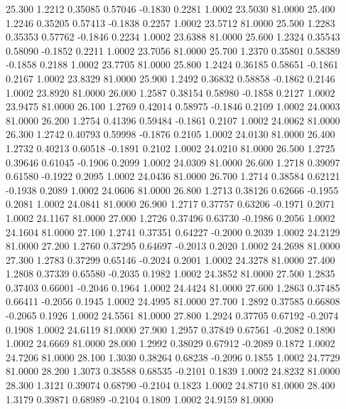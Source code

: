   25.300   1.2212   0.35085   0.57046  -0.1830   0.2281   1.0002  23.5030  81.0000
  25.400   1.2246   0.35205   0.57413  -0.1838   0.2257   1.0002  23.5712  81.0000
  25.500   1.2283   0.35353   0.57762  -0.1846   0.2234   1.0002  23.6388  81.0000
  25.600   1.2324   0.35543   0.58090  -0.1852   0.2211   1.0002  23.7056  81.0000
  25.700   1.2370   0.35801   0.58389  -0.1858   0.2188   1.0002  23.7705  81.0000
  25.800   1.2424   0.36185   0.58651  -0.1861   0.2167   1.0002  23.8329  81.0000
  25.900   1.2492   0.36832   0.58858  -0.1862   0.2146   1.0002  23.8920  81.0000
  26.000   1.2587   0.38154   0.58980  -0.1858   0.2127   1.0002  23.9475  81.0000
  26.100   1.2769   0.42014   0.58975  -0.1846   0.2109   1.0002  24.0003  81.0000
  26.200   1.2754   0.41396   0.59484  -0.1861   0.2107   1.0002  24.0062  81.0000
  26.300   1.2742   0.40793   0.59998  -0.1876   0.2105   1.0002  24.0130  81.0000
  26.400   1.2732   0.40213   0.60518  -0.1891   0.2102   1.0002  24.0210  81.0000
  26.500   1.2725   0.39646   0.61045  -0.1906   0.2099   1.0002  24.0309  81.0000
  26.600   1.2718   0.39097   0.61580  -0.1922   0.2095   1.0002  24.0436  81.0000
  26.700   1.2714   0.38584   0.62121  -0.1938   0.2089   1.0002  24.0606  81.0000
  26.800   1.2713   0.38126   0.62666  -0.1955   0.2081   1.0002  24.0841  81.0000
  26.900   1.2717   0.37757   0.63206  -0.1971   0.2071   1.0002  24.1167  81.0000
  27.000   1.2726   0.37496   0.63730  -0.1986   0.2056   1.0002  24.1604  81.0000
  27.100   1.2741   0.37351   0.64227  -0.2000   0.2039   1.0002  24.2129  81.0000
  27.200   1.2760   0.37295   0.64697  -0.2013   0.2020   1.0002  24.2698  81.0000
  27.300   1.2783   0.37299   0.65146  -0.2024   0.2001   1.0002  24.3278  81.0000
  27.400   1.2808   0.37339   0.65580  -0.2035   0.1982   1.0002  24.3852  81.0000
  27.500   1.2835   0.37403   0.66001  -0.2046   0.1964   1.0002  24.4424  81.0000
  27.600   1.2863   0.37485   0.66411  -0.2056   0.1945   1.0002  24.4995  81.0000
  27.700   1.2892   0.37585   0.66808  -0.2065   0.1926   1.0002  24.5561  81.0000
  27.800   1.2924   0.37705   0.67192  -0.2074   0.1908   1.0002  24.6119  81.0000
  27.900   1.2957   0.37849   0.67561  -0.2082   0.1890   1.0002  24.6669  81.0000
  28.000   1.2992   0.38029   0.67912  -0.2089   0.1872   1.0002  24.7206  81.0000
  28.100   1.3030   0.38264   0.68238  -0.2096   0.1855   1.0002  24.7729  81.0000
  28.200   1.3073   0.38588   0.68535  -0.2101   0.1839   1.0002  24.8232  81.0000
  28.300   1.3121   0.39074   0.68790  -0.2104   0.1823   1.0002  24.8710  81.0000
  28.400   1.3179   0.39871   0.68989  -0.2104   0.1809   1.0002  24.9159  81.0000

